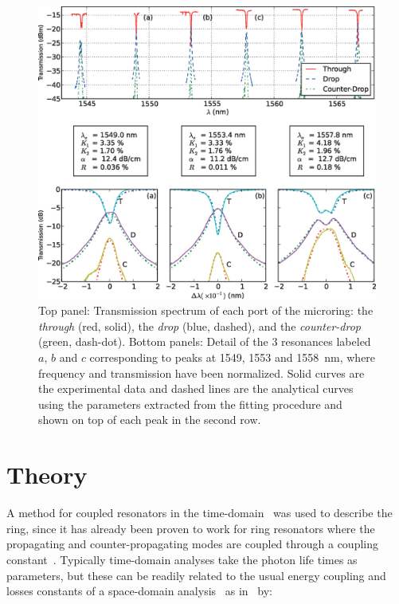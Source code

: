 \documentclass[10pt,letterpaper]{article}
\begin{document}
\begin{figure}[t]
    \centering
    \includegraphics[width=1.0\textwidth]{grafica_opexe.eps}
    \caption{Top panel: Transmission spectrum of each port of the microring: the \emph{through} (red, solid), the \emph{drop} (blue, dashed), and the \emph{counter-drop} (green, dash-dot). Bottom panels: Detail of the 3 resonances labeled $a$, $b$ and $c$ corresponding to peaks at 1549, 1553 and 1558~nm, where frequency and transmission have been normalized. Solid curves are the experimental data and dashed lines are the analytical curves using the parameters extracted from the fitting procedure and shown on top of each peak in the second row.}

    \label{fig:espectro}

\end{figure}


\section{Theory}
\label{sec:theory}

A method for coupled resonators in the time-domain~\cite{Haus1984} was used to describe the ring, since it has already been proven to work for ring resonators where the propagating and counter-propagating modes are coupled through a coupling constant~\cite{Zhang2008}.
Typically time-domain analyses take the photon life times as parameters, but these can be readily related to the usual energy coupling and losses constants of a space-domain analysis~\cite{J.HeebnerR.Grover2008} as in~\cite{Little1997} by:
\end{document}
